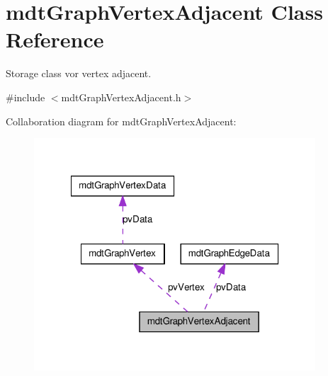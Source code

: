 \hypertarget{classmdt_graph_vertex_adjacent}{
\section{mdtGraphVertexAdjacent Class Reference}
\label{classmdt_graph_vertex_adjacent}
}


Storage class vor vertex adjacent.  




{\ttfamily \#include $<$mdtGraphVertexAdjacent.h$>$}



Collaboration diagram for mdtGraphVertexAdjacent:
\nopagebreak
\begin{figure}[H]
\begin{center}
\leavevmode
\includegraphics[width=298pt]{classmdt_graph_vertex_adjacent__coll__graph}
\end{center}
\end{figure}
